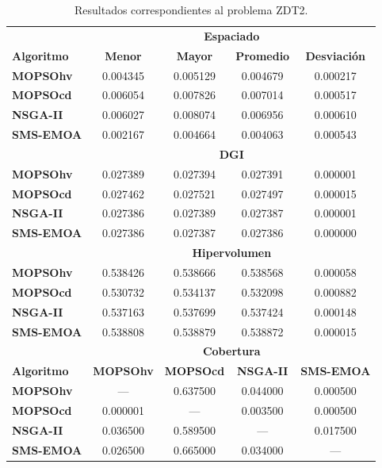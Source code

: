  \begin{table}
 \begin{center}
  \begin{tabular}{|l|cc|cc|} \hline
    & \multicolumn{4}{|c|}{\textbf{Espaciado}} \\ 
	\textbf{Algoritmo} & \textbf{Menor} & \textbf{Mayor} & \textbf{Promedio} & \textbf{Desviaci\'on} \\  \hline\hline
	\textbf{MOPSOhv} &0.004345 & 0.005129 & 0.004679 & 0.000217  \\ 
	\textbf{MOPSOcd} &0.006054 & 0.007826 & 0.007014 & 0.000517 \\ 
	\textbf{NSGA-II} &0.006027 & 0.008074 & 0.006956 & 0.000610  \\  
	\textbf{SMS-EMOA}&0.002167 & 0.004664 & 0.004063 & 0.000543  \\  
	\hline\hline
    & \multicolumn{4}{|c|}{\textbf{DGI}} \\ \hline \hline	
	\textbf{MOPSOhv} &0.027389 & 0.027394 & 0.027391 & 0.000001  \\ 
	\textbf{MOPSOcd} &0.027462 & 0.027521 & 0.027497 & 0.000015  \\ 
	\textbf{NSGA-II} &0.027386 & 0.027389 & 0.027387 & 0.000001  \\  
	\textbf{SMS-EMOA}&0.027386 & 0.027387 & 0.027386 & 0.000000  \\  
	\hline\hline
    & \multicolumn{4}{|c|}{\textbf{Hipervolumen}} \\ 	\hline \hline
	\textbf{MOPSOhv} &0.538426 & 0.538666 & 0.538568 & 0.000058 \\ 
	\textbf{MOPSOcd} &0.530732 & 0.534137 & 0.532098 & 0.000882   \\ 
	\textbf{NSGA-II} &0.537163 & 0.537699 & 0.537424 & 0.000148  \\  
	\textbf{SMS-EMOA}&0.538808 & 0.538879 & 0.538872 & 0.000015  \\  
	\hline\hline
    & \multicolumn{4}{|c|}{\textbf{Cobertura}} \\ \hline\hline 
	\textbf{Algoritmo} & \textbf{MOPSOhv} & \textbf{MOPSOcd} & \textbf{NSGA-II} & \textbf{SMS-EMOA} \\  \hline \hline
	\textbf{MOPSOhv} &---       & 0.637500 & 0.044000  & 0.000500 \\ 
	\textbf{MOPSOcd} & 0.000001 & ---      & 0.003500  & 0.000500 \\ 
	\textbf{NSGA-II} & 0.036500 & 0.589500 & ---      & 0.017500  \\  
	\textbf{SMS-EMOA}& 0.026500 & 0.665000 & 0.034000 & --- \\  
	\hline
	\end{tabular}
  \caption{Resultados correspondientes al problema ZDT2.}
  \label{tab:zdt2}
\end{center}
\end{table}
